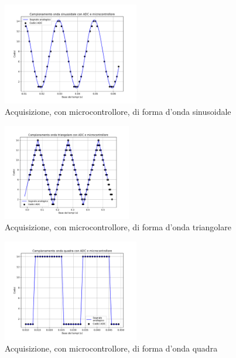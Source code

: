 \documentclass[journal]{IEEEtran}
\begin{document}
\begin{figure}[H]%
\begin{center}
\includegraphics[trim = {0 25 0 0},clip, width=0.53\textwidth]{analysis/output/mcu_sine.pdf}
\caption{Acquisizione, con microcontrollore, di forma d'onda sinusoidale}
\label{fig:mcu_sine}
\end{center}
\end{figure}

\begin{figure}[H]%
\begin{center}
\includegraphics[trim = {0 25 0 0},clip, width=0.50\textwidth]{analysis/output/mcu_triangle.pdf}
\caption{Acquisizione, con microcontrollore, di forma d'onda triangolare}
\label{fig:mcu_triang}
\end{center}
\end{figure}

\begin{figure}[H]%
\begin{center}
\includegraphics[trim = {0 25 0 0},clip, width=0.53\textwidth]{analysis/output/mcu_square.pdf}
\caption{Acquisizione, con microcontrollore, di forma d'onda quadra}
\label{fig:mcu_square}
\end{center}
\end{figure}
\end{document}
